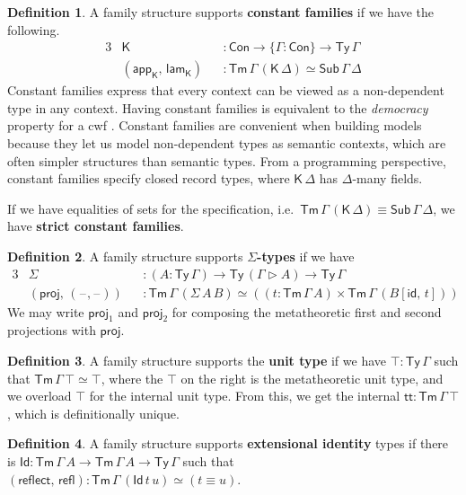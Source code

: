 \documentclass[12pt,a4paper,twoside,openany]{book}
\theoremstyle{remark}
\theoremstyle{definition}
\newtheorem{mydefinition}{Definition}
\theoremstyle{theorem}
\newcommand{\refl}{\mathsf{refl}}
\newcommand{\reflect}{\mathsf{reflect}}
\newcommand{\id}{\mathsf{id}}
\newcommand{\Con}{\mathsf{Con}}
\newcommand{\Sub}{\mathsf{Sub}}
\newcommand{\Tm}{\mathsf{Tm}}
\newcommand{\Ty}{\mathsf{Ty}}
\newcommand{\Id}{\mathsf{Id}}
\newcommand{\proj}{\mathsf{proj}}
\renewcommand{\tt}{\mathsf{tt}}
\newcommand{\blank}{\mathord{\hspace{1pt}\text{--}\hspace{1pt}}}
\newcommand{\ext}{\triangleright}
\newcommand{\lamK}{\mathsf{lam}_{\K}}
\newcommand{\appK}{\mathsf{app}_{\K}}
\newcommand{\K}{\mathsf{K}}
\begin{document}
\begin{mydefinition}
\label{def:constant-families}
A family structure supports \textbf{constant families} if we have the following.
\begin{alignat*}{3}
  & \K &&: \Con \to \{\Gamma : \Con \} \to \Ty\,\Gamma \\
  & (\appK,\,\lamK) &&: \Tm\,\Gamma\,(\K\,\Delta) \simeq \Sub\,\Gamma\,\Delta
\end{alignat*}
Constant families express that every context can be viewed as a non-dependent
type in any context. Having constant families is equivalent to the
\emph{democracy} property for a cwf
\cite{clairambault2014biequivalence,forsberg-phd}. Constant families are
convenient when building models because they let us model non-dependent types
as semantic contexts, which are often simpler structures than semantic types.
From a programming perspective, constant families specify closed record types,
where $\K\,\Delta$ has $\Delta$-many fields.

If we have equalities of sets for the specification,
i.e.\ $\Tm\,\Gamma\,(\K\,\Delta) \equiv \Sub\,\Gamma\,\Delta$, we have \textbf{strict
  constant families}.

\end{mydefinition}

\begin{mydefinition}
A family structure supports \textbf{$\Sigma$-types} if we have
\begin{alignat*}{3}
  & \Sigma  &&: (A : \Ty\,\Gamma) \to \Ty\,(\Gamma\ext A) \to \Ty\,\Gamma\\
  & (\proj,\,(\blank,\blank)) &&: \Tm\,\Gamma\,(\Sigma\,A\,B) \simeq ((t : \Tm\,\Gamma\,A) \times \Tm\,\Gamma\,(B[\id,\,t]))
\end{alignat*}
We may write $\proj_1$ and $\proj_2$ for composing the metatheoretic first and
second projections with $\proj$.
\end{mydefinition}

\begin{mydefinition}
A family structure supports the \textbf{unit type} if we have $\top : \Ty\,\Gamma$ such
that $\Tm\,\Gamma\,\top \simeq \top$, where the $\top$ on the right is the
metatheoretic unit type, and we overload $\top$ for the internal unit type.
From this, we get the internal $\tt : \Tm\,\Gamma\,\top$, which is
definitionally unique.
\end{mydefinition}

\begin{mydefinition}
A family structure supports \textbf{extensional identity} types if there is $\Id
: \Tm\,\Gamma\,A \to \Tm\,\Gamma\,A \to \Ty\,\Gamma$ such that
$(\reflect,\,\refl) : \Tm\,\Gamma\,(\Id\,t\,u) \simeq (t \equiv u)$.
\end{mydefinition}
\end{document}
